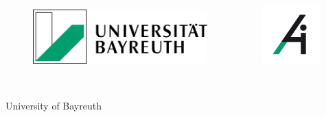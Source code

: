 


%


\thispagestyle{empty}


\begin{figure}[t]
 \centering
 \includegraphics[width=0.6\textwidth]{abb/logo1}
~~~~~~~~~~
 \includegraphics[width=0.20\textwidth]{abb/logo2}
\end{figure}


\begin{verbatim}


\end{verbatim}

\begin{center}
\Large{University of Bayreuth}\\
\end{center}


